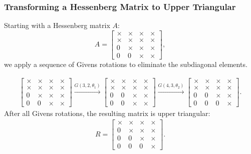 \documentclass[12pt]{article}
\begin{document}
\subsubsection{Transforming a Hessenberg Matrix to Upper Triangular}

Starting with a Hessenberg matrix \(A\):
\[
A = \begin{bmatrix}
\times & \times & \times & \times \\
\times & \times & \times & \times \\
0 & \times & \times & \times \\
0 & 0 & \times & \times
\end{bmatrix},
\]
we apply a sequence of Givens rotations to eliminate the subdiagonal elements.

\begin{align*}
\begin{bmatrix}
\times & \times & \times & \times \\
\times & \times & \times & \times \\
0 & \times & \times & \times \\
0 & 0 & \times & \times
\end{bmatrix}
\xrightarrow{G(3,2,\theta_1)}
\begin{bmatrix}
\times & \times & \times & \times \\
\times & \times & \times & \times \\
0 & 0 & \times & \times \\
0 & 0 & \times & \times
\end{bmatrix}
\xrightarrow{G(4,3,\theta_2)}
\begin{bmatrix}
\times & \times & \times & \times \\
\times & \times & \times & \times \\
0 & 0 & \times & \times \\
0 & 0 & 0 & \times
\end{bmatrix}.
\end{align*}
After all Givens rotations, the resulting matrix is upper triangular:
\begin{align*}
R = \begin{bmatrix}
\times & \times & \times & \times \\
0 & \times & \times & \times \\
0 & 0 & \times & \times \\
0 & 0 & 0 & \times
\end{bmatrix}.
\end{align*}
\end{document}
